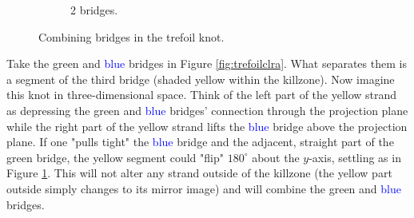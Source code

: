 \documentclass[titlepage]{article}
\begin{document}
\begin{figure}[h!]
\begin{subfigure}[b]{0.3\linewidth}
        \caption{2 bridges.}
        \label{fig:trefoilclrb}
    \end{subfigure}
    \caption{Combining bridges in the trefoil knot.}
    \label{fig:trefoilclr}
\end{figure}

Take the \textcolor{grx}{green} and \textcolor{blue}{blue} bridges in Figure \ref{fig:trefoilclra}. What separates them is a segment of the third bridge (shaded \textcolor{ylx}{yellow} within the killzone). Now imagine this knot in three-dimensional space. Think of the left part of the \textcolor{ylx}{yellow} strand as depressing the \textcolor{grx}{green} and \textcolor{blue}{blue} bridges' connection through the projection plane while the right part of the \textcolor{ylx}{yellow} strand lifts the \textcolor{blue}{blue} bridge above the projection plane. If one "pulls tight" the \textcolor{blue}{blue} bridge and the adjacent, straight part of the \textcolor{grx}{green} bridge, the \textcolor{ylx}{yellow} segment could "flip" $180^\circ$ about the $y$-axis, settling as in Figure \ref{fig:trefoilclrb}. This will not alter any strand outside of the killzone (the \textcolor{ylx}{yellow} part outside simply changes to its mirror image) and will combine the \textcolor{grx}{green} and \textcolor{blue}{blue} bridges.\par
\end{document}

